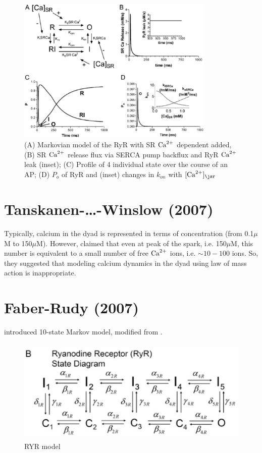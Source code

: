 \begin{figure}[hbt]
  \centerline{\includegraphics[height=7cm,
    angle=0]{./images/RyR_Shannon2004.eps}}
\caption{(A) Markovian model of the RyR with SR ${\text{Ca}^{2+}}$ dependent added, (B) SR
${\text{Ca}^{2+}}$ release flux via SERCA pump backflux and RyR ${\text{Ca}^{2+}}$ leak (inset); (C)
Profile of 4 individual state over the course of an AP; (D) $P_o$ of RyR and
(inset) changes in $k_{on}$ with $[\Ca]_\jsr$}
\label{fig:RyR_Shannon2004}
\end{figure}

\section{Tanskanen-\ldots-Winslow (2007)}
\label{sec:Tanskanen_2007_dyad}

Typically, calcium in the dyad is represented in terms of concentration (from
0.1$\mu$M to 150$\mu$M). However, \citep{tanskanen2007} claimed that even at
peak of the spark, i.e. 150$\mu$M, this number is equivalent to a small number
of free ${\text{Ca}^{2+}}$ ions, i.e. $\sim 10-100$ ions. So, they suggested that modeling
calcium dynamics in the dyad using law of mass action is inappropriate.



\section{Faber-Rudy (2007)}

\citep{faber2007DHPR} introduced 10-state Markov model, modified from
\citep{fill2000}.

\begin{figure}[htb]
  \centerline{\includegraphics[height=5cm]{./images/RYR_Faber2007.eps}}
  \caption{RYR model}
  \label{fig:RYR_Faber2007}
\end{figure}


